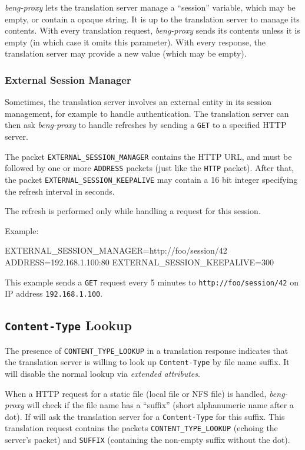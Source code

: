 \documentclass[a4paper,12pt]{article}
\begin{document}
\emph{beng-proxy} lets the translation server manage a ``session''
variable, which may be empty, or contain a opaque string.  It is up to
the translation server to manage its contents.  With every translation
request, \emph{beng-proxy} sends its contents unless it is empty (in
which case it omits this parameter).  With every response, the
translation server may provide a new value (which may be empty).

\subsubsection{External Session Manager}

Sometimes, the translation server involves an external entity in its
session management, for example to handle authentication.  The
translation server can then ask \emph{beng-proxy} to handle refreshes
by sending a \texttt{GET} to a specified HTTP server.

The packet \verb|EXTERNAL_SESSION_MANAGER| contains the HTTP URL, and
must be followed by one or more \verb|ADDRESS| packets (just like the
\verb|HTTP| packet).  After that, the packet
\verb|EXTERNAL_SESSION_KEEPALIVE| may contain a 16 bit integer
specifying the refresh interval in seconds.

The refresh is performed only while handling a request for this
session.

Example:

\begin{verbatim*}
EXTERNAL_SESSION_MANAGER=http://foo/session/42
ADDRESS=192.168.1.100:80
EXTERNAL_SESSION_KEEPALIVE=300
\end{verbatim*}

This example sends a \verb|GET| request every 5 minutes to
\texttt{http://foo/session/42} on IP address \texttt{192.168.1.100}.

\subsection{\texttt{Content-Type} Lookup}
\label{ctlookup}

The presence of \verb|CONTENT_TYPE_LOOKUP| in a translation response
indicates that the translation server is willing to look up
\texttt{Content-Type} by file name suffix.  It will disable the normal
lookup via \textit{extended attributes}.

When a HTTP request for a static file (local file or NFS file) is
handled, \emph{beng-proxy} will check if the file name has a
``suffix'' (short alphanumeric name after a dot).  If will ask the
translation server for a \texttt{Content-Type} for this suffix.  This
translation request contains the packets \verb|CONTENT_TYPE_LOOKUP|
(echoing the server's packet) and \verb|SUFFIX| (containing the
non-empty suffix without the dot).
\end{document}

